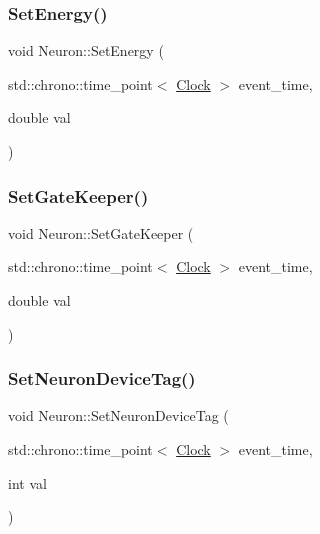 \mbox{\label{classNeuron_a5efa690ce4d8ff2f8dfb1fbfd84c5279}} 
\subsubsection{\texorpdfstring{Set\+Energy()}{SetEnergy()}}
{\footnotesize\ttfamily void Neuron\+::\+Set\+Energy (\begin{DoxyParamCaption}\item[{std\+::chrono\+::time\+\_\+point$<$ \mbox{\hyperlink{universe_8h_a0ef8d951d1ca5ab3cfaf7ab4c7a6fd80}{Clock}} $>$}]{event\+\_\+time,  }\item[{double}]{val }\end{DoxyParamCaption})\hspace{0.3cm}{\ttfamily [inline]}}

\mbox{\label{classNeuron_a492f597021faf1b74942bc75364c3c22}} 
\subsubsection{\texorpdfstring{Set\+Gate\+Keeper()}{SetGateKeeper()}}
{\footnotesize\ttfamily void Neuron\+::\+Set\+Gate\+Keeper (\begin{DoxyParamCaption}\item[{std\+::chrono\+::time\+\_\+point$<$ \mbox{\hyperlink{universe_8h_a0ef8d951d1ca5ab3cfaf7ab4c7a6fd80}{Clock}} $>$}]{event\+\_\+time,  }\item[{double}]{val }\end{DoxyParamCaption})\hspace{0.3cm}{\ttfamily [inline]}}

\mbox{\label{classNeuron_aa06d0f1a129e4a901a60e7343bc43533}} 
\subsubsection{\texorpdfstring{Set\+Neuron\+Device\+Tag()}{SetNeuronDeviceTag()}}
{\footnotesize\ttfamily void Neuron\+::\+Set\+Neuron\+Device\+Tag (\begin{DoxyParamCaption}\item[{std\+::chrono\+::time\+\_\+point$<$ \mbox{\hyperlink{universe_8h_a0ef8d951d1ca5ab3cfaf7ab4c7a6fd80}{Clock}} $>$}]{event\+\_\+time,  }\item[{int}]{val }\end{DoxyParamCaption})\hspace{0.3cm}{\ttfamily [inline]}}

